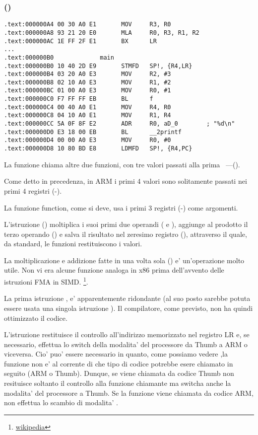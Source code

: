 \subsubsection{\NonOptimizingKeilVI (\ARMMode)}

\begin{lstlisting}[style=customasmARM]
.text:000000A4 00 30 A0 E1       MOV     R3, R0
.text:000000A8 93 21 20 E0       MLA     R0, R3, R1, R2
.text:000000AC 1E FF 2F E1       BX      LR
...
.text:000000B0             main
.text:000000B0 10 40 2D E9       STMFD   SP!, {R4,LR}
.text:000000B4 03 20 A0 E3       MOV     R2, #3
.text:000000B8 02 10 A0 E3       MOV     R1, #2
.text:000000BC 01 00 A0 E3       MOV     R0, #1
.text:000000C0 F7 FF FF EB       BL      f
.text:000000C4 00 40 A0 E1       MOV     R4, R0
.text:000000C8 04 10 A0 E1       MOV     R1, R4
.text:000000CC 5A 0F 8F E2       ADR     R0, aD_0        ; "%d\n"
.text:000000D0 E3 18 00 EB       BL      __2printf
.text:000000D4 00 00 A0 E3       MOV     R0, #0
.text:000000D8 10 80 BD E8       LDMFD   SP!, {R4,PC}
\end{lstlisting}

La funzione \main chiama altre due funzioni, con tre valori passati alla prima ~---(\ttf).

Come detto in precedenza, in ARM i primi 4 valori sono solitamente passati nei primi 4 registri (-).

La funzione \ttf function, come si deve, usa i primi 3 registri (-) come argomenti.

L'istruzione  () 
moltiplica i suoi primi due operandi ( e ), aggiunge al prodotto il terzo operando () e salva il risultato
nel zeresimo registro (), attraverso il quale, da standard, le funzioni restituiscono i valori.

La moltiplicazione e addizione fatte in una volta sola () e' un'operazione molto utile. 
Non vi era alcune funzione analoga in x86 prima dell'avvento delle istruzioni FMA in SIMD.
\footnote{\href{http://go.yurichev.com/17103}{wikipedia}}.

La prima istruzione , 
e' apparentemente ridondante (al suo posto sarebbe potuta essere usata una singola istruzione ). 
Il compilatore, come previsto, non ha quindi ottimizzato il codice.


L'istruzione  restituisce il controllo all'indirizzo memorizzato nel registro \ac{LR} e, se necessario, 
effettua lo switch della modalita' del processore da Thumb a ARM o viceversa.
Cio' puo' essere necessario in quanto, come possiamo vedere ,la funzione \ttf non e' al corrente di che tipo di codice potrebbe esere chiamato in seguito (ARM o Thumb).
Dunque, se viene chiamata da codice Thumb  non resituisce soltanto il controllo alla funzione chiamante ma switcha anche la modalita' del processore a Thumb. 
Se la funzione viene chiamata da codice ARM, non effettua lo scambio di modalita' .
